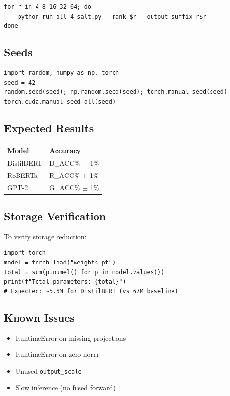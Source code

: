 \begin{lstlisting}
for r in 4 8 16 32 64; do
    python run_all_4_salt.py --rank $r --output_suffix r$r
done
\end{lstlisting}

\subsection{Seeds}

\begin{lstlisting}
import random, numpy as np, torch
seed = 42
random.seed(seed); np.random.seed(seed); torch.manual_seed(seed)
torch.cuda.manual_seed_all(seed)
\end{lstlisting}

\subsection{Expected Results}

\begin{table}[H]
\centering
\small
\begin{tabular}{ll}
\toprule
\textbf{Model} & \textbf{Accuracy} \\
\midrule
DistilBERT & {{D\_ACC}}\% $\pm$ 1\% \\
RoBERTa & {{R\_ACC}}\% $\pm$ 1\% \\
GPT-2 & {{G\_ACC}}\% $\pm$ 1\% \\
\bottomrule
\end{tabular}
\end{table}

\subsection{Storage Verification}

To verify storage reduction:

\begin{lstlisting}
import torch
model = torch.load("weights.pt")
total = sum(p.numel() for p in model.values())
print(f"Total parameters: {total}")
# Expected: ~5.6M for DistilBERT (vs 67M baseline)
\end{lstlisting}

\subsection{Known Issues}

\begin{itemize}
\item RuntimeError on missing projections
\item RuntimeError on zero norm
\item Unused \texttt{output\_scale}
\item Slow inference (no fused forward)

\end{itemize}
